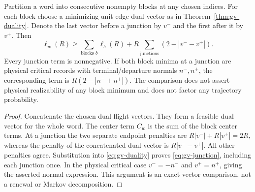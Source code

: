 \begin{proposition}
\label{prop:gv-junction}
Partition a word into consecutive nonempty blocks at any chosen
indices. For each block choose a minimizing unit-edge dual vector as
in Theorem~\ref{thm:gv-duality}. Denote the last vector before a
junction by $v^-$ and the first after it by $v^+$. Then
\begin{equation}\label{eq:gv-junction}
 \ell_w(R)\ge\sum_{\text{blocks }b}\ell_b(R)
                  +R\sum_{\text{junctions}}(2-|v^--v^+|).
\end{equation}
Every junction term is nonnegative. If both block minima at a junction
are physical critical records with terminal/departure normals
$n^-,n^+$, the corresponding term is $R(2-|n^-+n^+|)$.
The comparison does not assert physical realizability of any block
minimum and does not factor any trajectory probability.
\end{proposition}
\begin{proof}
Concatenate the chosen dual flight vectors. They form a feasible dual
vector for the whole word. The center term $C_w$ is the sum of the
block center terms. At a junction the two separate endpoint penalties
are $R|v^-|+R|v^+|=2R$, whereas the penalty of the concatenated dual
vector is $R|v^--v^+|$. All other penalties agree. Substitution into
\eqref{eq:gv-duality} proves \eqref{eq:gv-junction}, including each
junction once. In the physical critical case $v^-=-n^-$ and
$v^+=n^+$, giving the asserted normal expression. This argument is
an exact vector comparison, not a renewal or Markov decomposition.
\end{proof}

